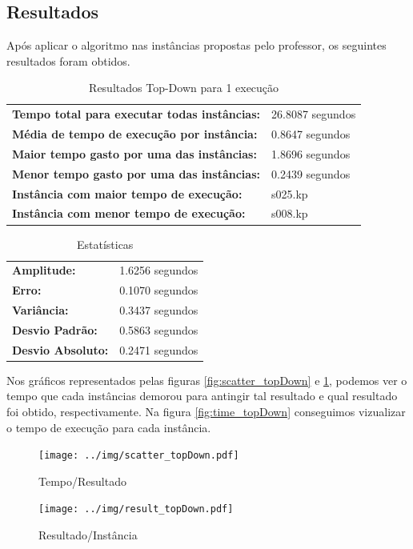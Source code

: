 \documentclass[a4paper, 12pt]{article}
\begin{document}
\subsection{Resultados}

Após aplicar o algoritmo  nas instâncias propostas pelo professor, os seguintes resultados
foram obtidos.
\begin{table}[!htb]
    \begin{tabular}{ll}
    \textbf{Tempo total para executar todas instâncias:} & 26.8087 segundos \\
    \textbf{Média de tempo de execução por instância:} & 0.8647 segundos \\
    \textbf{Maior tempo gasto por uma das instâncias:} & 1.8696 segundos \\
    \textbf{Menor tempo gasto por uma das instâncias:} & 0.2439 segundos \\
    \textbf{Instância com maior tempo de execução:} & s025.kp \\
    \textbf{Instância com menor tempo de execução:} & s008.kp
    \end{tabular}
    \caption{Resultados Top-Down para 1 execução}
    \label{tab:topdown_exec}
\end{table}
\vspace{-15pt}
\begin{table}[!htb]
    \begin{tabular}{ll}
    \textbf{Amplitude:} & 1.6256 segundos \\
    \textbf{Erro:} & 0.1070 segundos \\
    \textbf{Variância:} & 0.3437 segundos \\
    \textbf{Desvio Padrão:} & 0.5863 segundos \\
    \textbf{Desvio Absoluto:} & 0.2471 segundos
    \end{tabular}
    \caption{Estatísticas}
    \label{tab:estatistica_topdown}
\end{table}

\newpage
Nos gráficos representados pelas figuras \ref{fig:scatter_topDown} e \ref{fig:result_topDown}, podemos ver o tempo
que cada instâncias demorou para antingir tal resultado e qual resultado foi obtido, respectivamente. 
Na figura \ref{fig:time_topDown} conseguimos vizualizar o tempo de execução para cada instância.
\begin{figure}[!htb]
    \centering
    \begin{minipage}{0.55\textwidth}
        \centering
        \texttt{[image: ../img/scatter\_topDown.pdf]}
        \caption{Tempo/Resultado}
        \label{fig:scatter_topDown}
    \end{minipage}%
    \begin{minipage}{0.55\textwidth}
        \centering
        \texttt{[image: ../img/result\_topDown.pdf]}
        \caption{Resultado/Instância}
        \label{fig:result_topDown}
    \end{minipage}
\end{figure}
\end{document}
